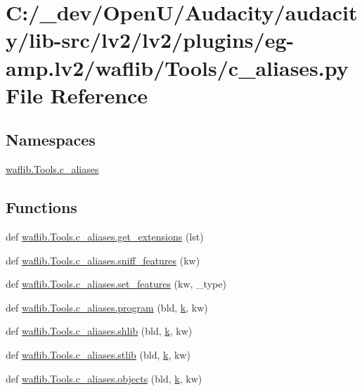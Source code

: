 \hypertarget{lv2_2plugins_2eg-amp_8lv2_2waflib_2_tools_2c__aliases_8py}{}\section{C\+:/\+\_\+dev/\+Open\+U/\+Audacity/audacity/lib-\/src/lv2/lv2/plugins/eg-\/amp.lv2/waflib/\+Tools/c\+\_\+aliases.py File Reference}
\label{lv2_2plugins_2eg-amp_8lv2_2waflib_2_tools_2c__aliases_8py}
\subsection*{Namespaces}
\begin{DoxyCompactItemize}
\item 
 \hyperlink{namespacewaflib_1_1_tools_1_1c__aliases}{waflib.\+Tools.\+c\+\_\+aliases}
\end{DoxyCompactItemize}
\subsection*{Functions}
\begin{DoxyCompactItemize}
\item 
def \hyperlink{namespacewaflib_1_1_tools_1_1c__aliases_a2c236bc286989e7a4856c0c855d7867d}{waflib.\+Tools.\+c\+\_\+aliases.\+get\+\_\+extensions} (lst)
\item 
def \hyperlink{namespacewaflib_1_1_tools_1_1c__aliases_a5dc841eb61d3c43326b4c75f23c8f771}{waflib.\+Tools.\+c\+\_\+aliases.\+sniff\+\_\+features} (kw)
\item 
def \hyperlink{namespacewaflib_1_1_tools_1_1c__aliases_a9676c4aa7388b63dcb8146ee0b1eabb7}{waflib.\+Tools.\+c\+\_\+aliases.\+set\+\_\+features} (kw, \+\_\+type)
\item 
def \hyperlink{namespacewaflib_1_1_tools_1_1c__aliases_a37f66fad92eb3e5608e4ea6cc919987c}{waflib.\+Tools.\+c\+\_\+aliases.\+program} (bld, \hyperlink{rfft2d_test_m_l_8m_adc468c70fb574ebd07287b38d0d0676d}{k}, kw)
\item 
def \hyperlink{namespacewaflib_1_1_tools_1_1c__aliases_abe1769b56363a382ee98a9ffbd9fcc3c}{waflib.\+Tools.\+c\+\_\+aliases.\+shlib} (bld, \hyperlink{rfft2d_test_m_l_8m_adc468c70fb574ebd07287b38d0d0676d}{k}, kw)
\item 
def \hyperlink{namespacewaflib_1_1_tools_1_1c__aliases_ac17e9b8cf40b90cb8f7a0262e1b6208e}{waflib.\+Tools.\+c\+\_\+aliases.\+stlib} (bld, \hyperlink{rfft2d_test_m_l_8m_adc468c70fb574ebd07287b38d0d0676d}{k}, kw)
\item 
def \hyperlink{namespacewaflib_1_1_tools_1_1c__aliases_a7b447b92707b996e71d30214f7b28555}{waflib.\+Tools.\+c\+\_\+aliases.\+objects} (bld, \hyperlink{rfft2d_test_m_l_8m_adc468c70fb574ebd07287b38d0d0676d}{k}, kw)
\end{DoxyCompactItemize}
